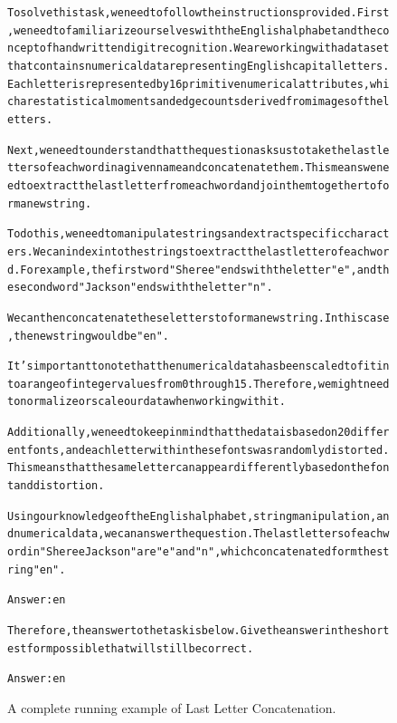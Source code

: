 \begin{figure}[t]
{{\begin{alltt}
To solve this task, we need to follow the instructions provided. First, we need to familiarize ourselves with the English alphabet and the concept of handwritten digit recognition. We are working with a dataset that contains numerical data representing English capital letters. Each letter is represented by 16 primitive numerical attributes, which are statistical moments and edge counts derived from images of the letters.

Next, we need to understand that the question asks us to take the last letters of each word in a given name and concatenate them. This means we need to extract the last letter from each word and join them together to form a new string.

To do this, we need to manipulate strings and extract specific characters. We can index into the strings to extract the last letter of each word. For example, the first word "Sheree" ends with the letter "e", and the second word "Jackson" ends with the letter "n".

We can then concatenate these letters to form a new string. In this case, the new string would be "e n".

It's important to note that the numerical data has been scaled to fit into a range of integer values from 0 through 15. Therefore, we might need to normalize or scale our data when working with it.

Additionally, we need to keep in mind that the data is based on 20 different fonts, and each letter within these fonts was randomly distorted. This means that the same letter can appear differently based on the font and distortion.

Using our knowledge of the English alphabet, string manipulation, and numerical data, we can answer the question. The last letters of each word in "Sheree Jackson" are "e" and "n", which concatenated form the string "en".

Answer: en

Therefore, the answer to the task is below. Give the answer in the shortest form possible that will still be correct.

Answer: en
\end{alltt}
}}
\caption{A complete running example of Last Letter Concatenation.}
\label{fig:letter_example}
\end{figure}
